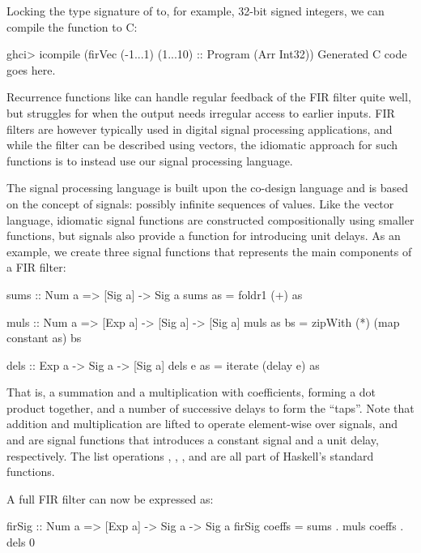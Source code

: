 \documentclass[../main.tex]{subfiles}
\begin{document}
Locking the type signature of  to, for example, 32-bit signed integers, we can compile the function to C:

\begin{code}
ghci> icompile (firVec (-1...1) (1...10) :: Program (Arr Int32))
Generated C code goes here.
\end{code}

Recurrence functions like  can handle regular feedback of the FIR filter quite well, but struggles for when the output needs irregular access to earlier inputs. FIR filters are however typically used in digital signal processing applications, and while the filter can be described using vectors, the idiomatic approach for such functions is to instead use our signal processing language. 

The signal processing language is built upon the co-design language and is based on the concept of signals: possibly infinite sequences of values. Like the vector language, idiomatic signal functions are constructed compositionally using smaller functions, but signals also provide a function for introducing unit delays. As an example, we create three signal functions that represents the main components of a FIR filter:

\begin{code}
sums :: Num a => [Sig a] -> Sig a
sums as = foldr1 (+) as

muls :: Num a => [Exp a] -> [Sig a] -> [Sig a]
muls as bs = zipWith (*) (map constant as) bs

dels :: Exp a -> Sig a -> [Sig a]
dels e as = iterate (delay e) as
\end{code}

\noindent That is, a summation and a multiplication with coefficients, forming a dot product together, and a number of successive delays to form the ``taps''. Note that addition and multiplication are lifted to operate element-wise over signals, and  and  are signal functions that introduces a constant signal and a unit delay, respectively. The list operations , , , and  are all part of Haskell's standard functions.

A full FIR filter can now be expressed as:

\begin{code}
firSig :: Num a => [Exp a] -> Sig a -> Sig a
firSig coeffs = sums . muls coeffs . dels 0
\end{code}
\end{document}
